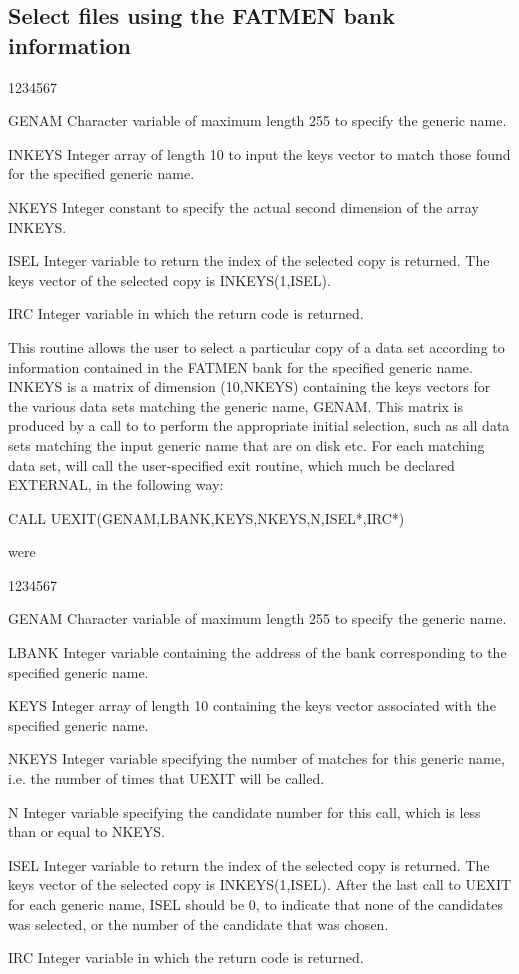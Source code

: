 \subsection{Select files using the FATMEN bank information}
\begin{DLtt}{1234567}
\item[GENAM]
Character variable of maximum length 255 to specify the generic name.
\item[INKEYS ]
Integer array of length 10 to input the keys vector to match those
found for the specified generic name.
\item[NKEYS]
Integer constant to specify the actual second dimension of
the array INKEYS.
\item[ISEL]
Integer variable to return the index of the selected copy
is returned. The keys vector of the selected copy is INKEYS(1,ISEL).
\item[IRC]
Integer variable in which the return code is returned.
\end{DLtt}
\par
This routine allows the user to select a particular copy of a data set
according to information contained in the FATMEN bank for the specified
generic name. INKEYS is a matrix of dimension (10,NKEYS) containing
the keys vectors for the various data sets matching the generic name, GENAM.
This matrix is produced by a call to  to perform the appropriate
initial selection, such as all data sets matching the input generic
name that are on disk etc. For each matching data set,  will
call the user-specified exit routine, which much be declared EXTERNAL,
in the following way:
\begin{XMP}
       CALL UEXIT(GENAM,LBANK,KEYS,NKEYS,N,ISEL*,IRC*)
\end{XMP}
were
\begin{DLtt}{1234567}
\item[GENAM]
Character variable of maximum length 255 to specify the generic name.
\item[LBANK]
Integer variable containing the address of the bank corresponding
to the specified generic name.
\item[KEYS ]
Integer array of length 10 containing the keys vector associated
with the specified generic name.
\item[NKEYS]
Integer variable specifying the number of matches for this
generic name, i.e. the number of times that UEXIT will be called.
\item[N]
Integer variable specifying the candidate number for this call,
which is less than or equal to NKEYS.
\item[ISEL]
Integer variable to return the index of the selected copy
is returned. The keys vector of the selected copy is INKEYS(1,ISEL).
After the last call to UEXIT for each generic name, ISEL should
be 0, to indicate that none of the candidates was selected, or
the number of the candidate that was chosen.
\item[IRC]
Integer variable in which the return code is returned.
\end{DLtt}
